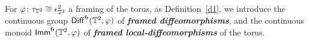 \documentclass{amsart}
\theoremstyle{definition}
\theoremstyle{remark}
\DeclareMathOperator{\End}{\sf End}
\newcommand{\bit}[1]{\textbf{\textit{#1}}}
\newcommand{\lacts}{\curvearrowright}
\DeclareMathOperator{\Diff}{{\sf Diff}}
\DeclareMathOperator{\fr}{\sf fr}
\newcommand{\w}{\widetilde}
\newcommand{\xra}{\xrightarrow}
\def\sE{\mathsf E}\def\sF{\mathsf F}\def\sG{\mathsf G}\def\sH{\mathsf H}
\DeclareMathOperator{\Ebraid}{\w{\sf E}_{2}^{+}(\ZZ)}
\DeclareMathOperator{\Imm}{\sf Imm}
\DeclareMathOperator{\EpZ}{\sE^+_2(\ZZ)}
\begin{document}





For $\varphi \colon  \tau_{\mathbb T^2} \cong \epsilon^2_{\mathbb T^2}$ a framing of the torus, as Definition~\ref{d1}, we introduce the continuous group $\Diff^{\fr}(\TT^2,\varphi)$ of \bit{framed diffeomorphisms}, and the continuous monoid $\Imm^{\fr}(\TT^2, \varphi)$ of \bit{framed local-diffeomorphisms} of the torus.
 
\end{document}
